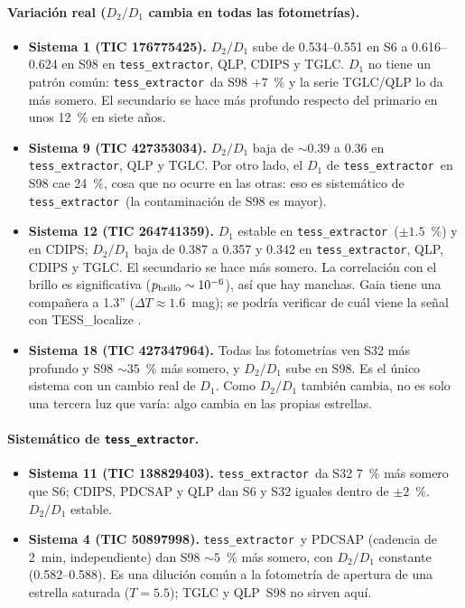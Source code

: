 \documentclass[11pt,a4paper]{article}
\newcommand{\tx}{\texttt{tess\_extractor}}
\newcommand{\Dum}{D_2/D_1}
\begin{document}
\paragraph{Variación real ($\Dum$ cambia en todas las fotometrías).}
\begin{itemize}
\item \textbf{Sistema 1 (TIC 176775425).} $\Dum$ sube de 0.534--0.551 en S6 a 0.616--0.624 en S98 en
  \tx, QLP, CDIPS y TGLC. $D_1$ no tiene un patrón común: \tx\ da S98 $+7$~\% y la serie TGLC/QLP lo
  da más somero. El secundario se hace más profundo respecto del primario en unos 12~\% en siete años.
\item \textbf{Sistema 9 (TIC 427353034).} $\Dum$ baja de $\sim0.39$ a 0.36 en \tx, QLP y TGLC. Por
  otro lado, el $D_1$ de \tx\ en S98 cae 24~\%, cosa que no ocurre en las otras: eso es sistemático de
  \tx\ (la contaminación de S98 es mayor).
\item \textbf{Sistema 12 (TIC 264741359).} $D_1$ estable en \tx\ ($\pm1.5$~\%) y en CDIPS; $\Dum$ baja de
  0.387 a 0.357 y 0.342 en \tx, QLP, CDIPS y TGLC. El secundario se hace más somero. La correlación con el
  brillo es significativa ($p_{\rm brillo}\sim10^{-6}$), así que hay manchas. Gaia tiene una compañera a
  1.3'' ($\Delta T\approx1.6$~mag); se podría verificar de cuál viene la señal con TESS\_localize
  \citep{HigginsBell2023}.
\item \textbf{Sistema 18 (TIC 427347964).} Todas las fotometrías ven S32 más profundo y S98 $\sim35$~\% más
  somero, y $\Dum$ sube en S98. Es el único sistema con un cambio real de $D_1$. Como $\Dum$ también
  cambia, no es solo una tercera luz que varía: algo cambia en las propias estrellas.
\end{itemize}

\paragraph{Sistemático de \tx.}
\begin{itemize}
\item \textbf{Sistema 11 (TIC 138829403).} \tx\ da S32 $7$~\% más somero que S6; CDIPS, PDCSAP y QLP dan
  S6 y S32 iguales dentro de $\pm2$~\%. $\Dum$ estable.
\item \textbf{Sistema 4 (TIC 50897998).} \tx\ y PDCSAP (cadencia de 2~min, independiente) dan S98
  $\sim5$~\% más somero, con $\Dum$ constante (0.582--0.588). Es una dilución común a la fotometría de
  apertura de una estrella saturada ($T=5.5$); TGLC y QLP~S98 no sirven aquí.
\end{itemize}
\end{document}

